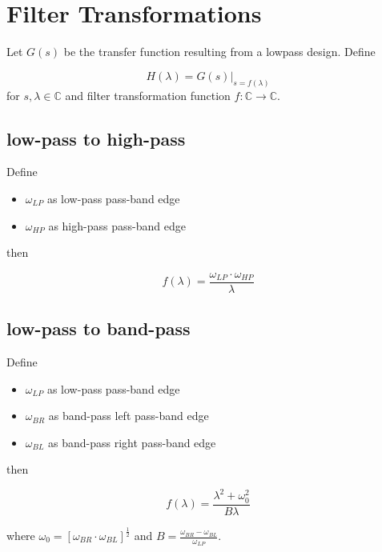 \documentclass{article}
\begin{document}
\section{Filter Transformations}

Let $G(s)$ be the transfer function resulting from a lowpass design. Define

\[
H(\lambda) = \left. G(s) \right|_{s = f(\lambda)}
\]
for $s,\lambda\in\mathbb{C}$ and filter transformation function $f:\mathbb{C} \rightarrow \mathbb{C}$.

\subsection{low-pass to high-pass}

Define
\begin{itemize}
\item $\omega_{LP}$ as low-pass pass-band edge
\item $\omega_{HP}$ as high-pass pass-band edge
\end{itemize}
then

\[
f(\lambda) = \frac{\omega_{LP}\cdot \omega_{HP}}{\lambda}
\]

\subsection{low-pass to band-pass}

Define
\begin{itemize}
\item $\omega_{LP}$ as low-pass pass-band edge
\item $\omega_{BR}$ as band-pass left pass-band edge
\item $\omega_{BL}$ as band-pass right pass-band edge
\end{itemize}
then

\[
f(\lambda) = \frac{\lambda^2 + \omega_0^2}{B\lambda}
\]

where $\omega_0 = \left[ \omega_{BR}\cdot\omega_{BL}\right]^{\frac{1}{2}}$ and $B=\frac{\omega_{BR}-\omega_{BL}}{\omega_{LP}}$.
\end{document}
